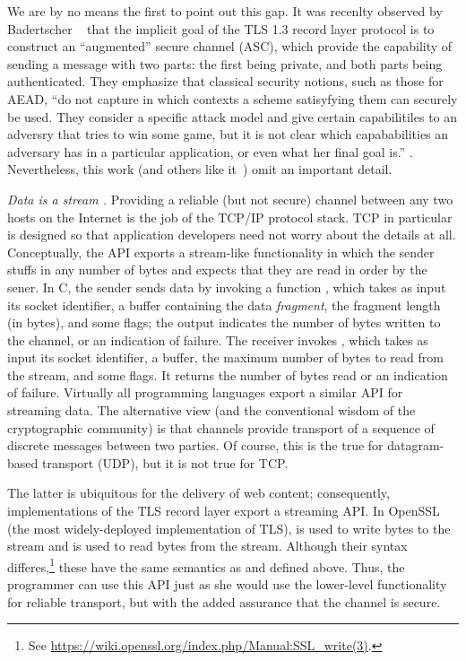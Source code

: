 We are by no means the first to point out this gap. It was recenlty observed by
Badertscher \etal~\cite{BMM+15} that the implicit goal of the TLS 1.3
record layer protocol is to construct an ``augmented'' secure channel (ASC), which
provide the capability of sending a message with two parts: the first being
private, and both parts being authenticated. They emphasize that classical
security notions, such as those for AEAD, ``do not capture in which contexts a
scheme satisyfying them can securely be used. They consider a specific attack
model and give certain capabilitiles to an adversry that tries to win some game,
but it is not \apriori clear which capababilities an adversary has in a
particular application, or even what her final goal is.'' \cite[pp. 2]{BMM+15}.
Nevertheless, this work (and others like it~\cite{BKN02,PRS11}) omit an important
detail.

\emph{Data is a stream \cite{FPMG15}.}
Providing a reliable (but not secure) channel between any two hosts on the Internet
is the job of the TCP/IP protocol stack. TCP in particular is designed so that
application developers need not worry about the details at all.
%
Conceptually, the API exports a stream-like functionality in which the sender
stuffs in any number of bytes and expects that they are read in order by the
sener.
%
In C, the sender sends data by invoking a function , which
takes as input its socket identifier, a buffer containing the data
\emph{fragment}, the fragment length (in bytes), and some flags; the output
indicates the number of bytes written to the channel, or an indication of
failure. The receiver invokes , which takes as input its socket
identifier, a buffer, the maximum number of bytes to read from the stream, and
some flags. It returns the number of bytes read or an indication of failure.
%
Virtually all programming languages export a similar API for streaming data. The
alternative view (and the conventional wisdom of the cryptographic community) is
that channels provide transport of a sequence of discrete messages between two
parties. Of course, this is the true for datagram-based transport (UDP), but it
is not true for TCP.

The latter is ubiquitous for the delivery of web content; consequently,
implementations of the TLS record layer export a streaming API. In OpenSSL (the
most widely-deployed implementation of TLS),  is used to
write bytes to the stream and  is used to read bytes from
the stream. Although their syntax differes,\footnote{ See
\url{https://wiki.openssl.org/index.php/Manual:SSL_write(3)}.} these have the
same semantics as  and  defined above. Thus,
the programmer can use this API just as she would use the lower-level
functionality for reliable transport, but with the added assurance that the
channel is secure.

